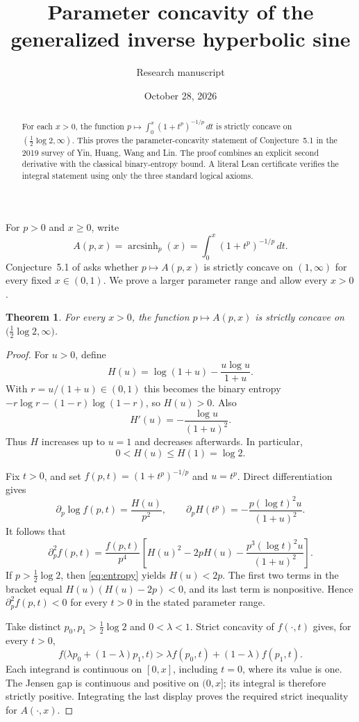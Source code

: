 \documentclass[11pt]{article}
\title{Parameter concavity of the generalized inverse hyperbolic sine}
\author{Research manuscript}
\date{October 28, 2026}
\newtheorem{theorem}{Theorem}
\begin{document}
\maketitle
\begin{abstract}
For each $x>0$, the function
$p\mapsto\int_0^x(1+t^p)^{-1/p}\,dt$ is strictly concave on
$(\tfrac12\log 2,\infty)$. This proves the parameter-concavity statement
of Conjecture~5.1 in the 2019 survey of Yin, Huang, Wang and Lin.
The proof combines an explicit second derivative with the classical
binary-entropy bound. A literal Lean certificate verifies the integral
statement using only the three standard logical axioms.
\end{abstract}

For $p>0$ and $x\geq0$, write
\begin{equation}\label{eq:def}
 A(p,x)=\operatorname{arcsinh}_p(x)
       =\int_0^x(1+t^p)^{-1/p}\,dt.
\end{equation}
Conjecture~5.1 of \cite{YHWL} asks whether $p\mapsto A(p,x)$ is strictly
concave on $(1,\infty)$ for every fixed $x\in(0,1)$. We prove a larger
parameter range and allow every $x>0$.

\begin{theorem}\label{thm:main}
For every $x>0$, the function $p\mapsto A(p,x)$ is strictly concave on
$\bigl(\tfrac12\log 2,\infty\bigr)$.
\end{theorem}

\begin{proof}
For $u>0$, define
\[
 H(u)=\log(1+u)-\frac{u\log u}{1+u}.
\]
With $r=u/(1+u)\in(0,1)$ this becomes the binary entropy
$-r\log r-(1-r)\log(1-r)$, so $H(u)>0$. Also
\[
 H'(u)=-\frac{\log u}{(1+u)^2}.
\]
Thus $H$ increases up to $u=1$ and decreases afterwards. In particular,
\begin{equation}\label{eq:entropy}
 0<H(u)\leq H(1)=\log 2.
\end{equation}

Fix $t>0$, and set $f(p,t)=(1+t^p)^{-1/p}$ and $u=t^p$.
Direct differentiation gives
\[
 \partial_p\log f(p,t)=\frac{H(u)}{p^2},\qquad
 \partial_p H(t^p)=-\frac{p(\log t)^2u}{(1+u)^2}.
\]
It follows that
\begin{equation}\label{eq:deriv}
 \partial_p^2 f(p,t)=\frac{f(p,t)}{p^4}
 \left[H(u)^2-2pH(u)-\frac{p^3(\log t)^2u}{(1+u)^2}\right].
\end{equation}
If $p>\tfrac12\log2$, then \eqref{eq:entropy} yields
$H(u)<2p$. The first two terms in the bracket equal
$H(u)(H(u)-2p)<0$, and its last term is nonpositive. Hence
$\partial_p^2 f(p,t)<0$ for every $t>0$ in the stated parameter range.

Take distinct $p_0,p_1>\tfrac12\log2$ and $0<\lambda<1$.
Strict concavity of $f(\cdot,t)$ gives, for every $t>0$,
\[
 f\bigl(\lambda p_0+(1-\lambda)p_1,t\bigr)
 >\lambda f(p_0,t)+(1-\lambda)f(p_1,t).
\]
Each integrand is continuous on $[0,x]$, including $t=0$, where its
value is one. The Jensen gap is continuous and positive on $(0,x]$;
its integral is therefore strictly positive. Integrating the last display
proves the required strict inequality for $A(\cdot,x)$.
\end{proof}
\end{document}
